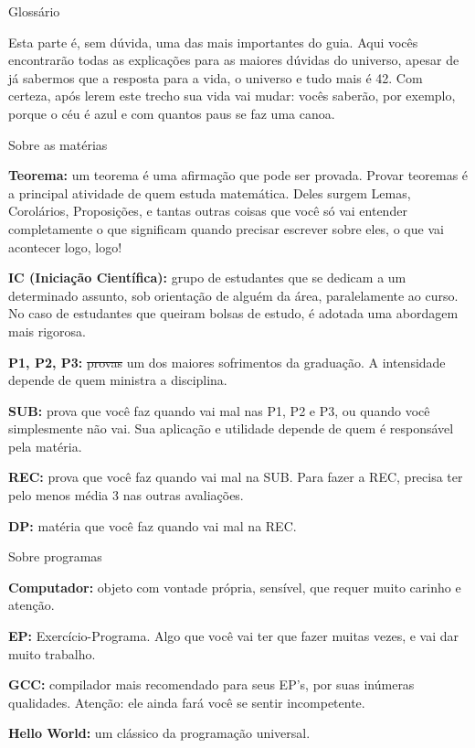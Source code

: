 \begin{secao}{Glossário}

Esta parte é, sem dúvida, uma das mais importantes do guia. Aqui vocês
encontrarão todas as explicações para as maiores dúvidas do universo, apesar de
já sabermos que a resposta para a vida, o universo e tudo mais é 42. Com
certeza, após lerem este trecho sua vida vai mudar: vocês saberão, por exemplo,
porque o céu é azul e com quantos paus se faz uma canoa.

\begin{subsecao}{Sobre as matérias}

{\bf Teorema:} um teorema é uma afirmação que pode ser provada. Provar
teoremas é a principal atividade de quem estuda matemática. Deles surgem Lemas,
Corolários, Proposições, e tantas outras coisas que você só vai entender
completamente o que significam quando precisar escrever sobre eles, o que vai
acontecer logo, logo!

{\bf IC (Iniciação Científica):} grupo de estudantes que se dedicam a um
determinado assunto, sob orientação de alguém da área, paralelamente ao curso.
No caso de estudantes que queiram bolsas de estudo, é adotada uma abordagem
mais rigorosa.

{\bf P1, P2, P3:} \sout{provas} um dos maiores sofrimentos da graduação. 
A intensidade depende de quem ministra a disciplina.

{\bf SUB:} prova que você faz quando vai mal nas P1, P2 e P3, ou quando você
simplesmente não vai. Sua aplicação e utilidade depende de quem é responsável
pela matéria.

{\bf REC:} prova que você faz quando vai mal na SUB. Para fazer a REC, precisa
ter pelo menos média 3 nas outras avaliações.

{\bf DP:} matéria que você faz quando vai mal na REC.
\end{subsecao}

\begin{subsecao}{Sobre programas}

{\bf Computador:} objeto com vontade própria, sensível, que requer muito
carinho e atenção.

{\bf EP:} Exercício-Programa. Algo que você vai ter que fazer muitas vezes, e
vai dar muito trabalho.

{\bf GCC:} compilador mais recomendado para seus EP's, por suas inúmeras
qualidades. Atenção: ele ainda fará você se sentir incompetente.

{\bf Hello World:} um clássico da programação universal.


\end{subsecao}
\end{secao}
